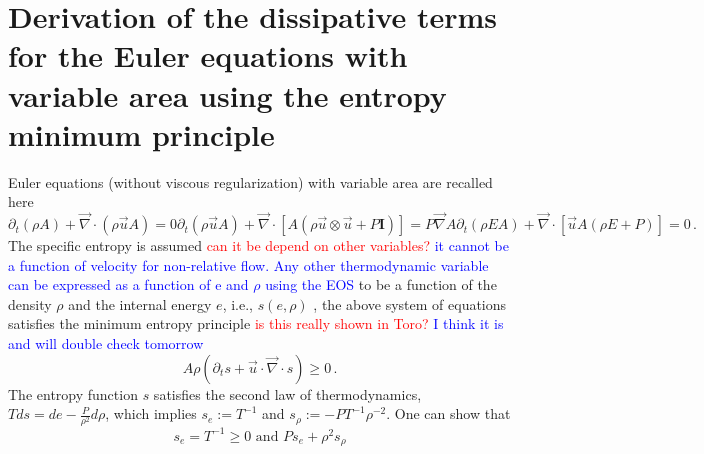 \documentclass[preprint,10pt]{elsarticle}
\renewcommand{\div}{\vec{\nabla}\! \cdot \!}
\newcommand{\grad}{\vec{\nabla}}
\newcommand{\tcr}[1]{\textcolor{red}{#1}}
\newcommand{\tcb}[1]{\textcolor{blue}{#1}}
\begin{document}
\newpage
\section{Derivation of the dissipative terms for the Euler equations with variable area using the entropy minimum principle} \label{app:diss_terms}
%
Euler equations (without viscous regularization) with variable area are recalled here
%
\begin{subequations}
\label{app:euler_variable_A}
%
\begin{equation}
\partial_t \left( \rho A \right) + \div \left( \rho \vec{u} A \right) = 0 
\end{equation}
%
\begin{equation}
\partial_t \left( \rho \vec{u} A \right) + \div \left[A\left( \rho \vec{u} \otimes \vec{u} + P \mathbf{I} \right) \right] = P \grad A 
\end{equation}
% 
\begin{equation}
\partial_t \left( \rho E A \right) + \div \left[ \vec{u} A \left( \rho E + P \right) \right] = 0 \,.
\end{equation}
\end{subequations}
%
The specific entropy is assumed \tcr{can it be depend on other variables?} \tcb{it cannot be a function of velocity for non-relative flow. Any other thermodynamic variable can be expressed as a function of e and $\rho$ using the EOS} to be a function of the density $\rho$ and the internal energy $e$, i.e., $s(e,\rho)$ , the above system of equations satisfies the minimum entropy principle \cite{Toro} \tcr{is this really shown in Toro?} \tcb{I think it is and will double check tomorrow}
%
\begin{equation}
A \rho \left( \partial_t s + \vec{u} \cdot \div s \right) \geq 0 \, .
\end{equation}
%
The entropy function $s$ satisfies the second law of thermodynamics, $T ds = de - \frac{P}{\rho^2} d \rho$, which implies $s_e := T^{-1}$ and $s_\rho := -P T^{-1} \rho^{-2}$. One can show that \cite{jlg}
%
\begin{equation}
s_e = T^{-1} \geq 0 \text{ and }
Ps_e + \rho^2 s_{\rho} 
\end{equation}
\end{document}
